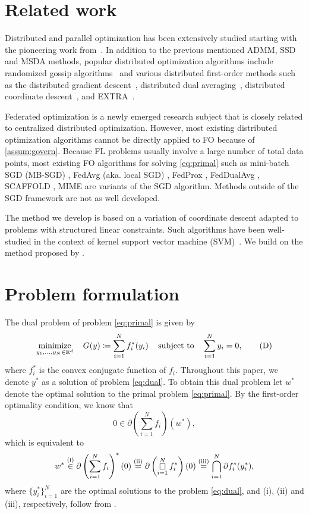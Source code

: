 \section{Related work}
\label{sec:relatedWork}

Distributed and parallel optimization has been extensively studied starting with the pioneering work from~\citet{Bertsekas89}. In addition to the previous mentioned ADMM, SSD and MSDA methods, popular distributed optimization algorithms include randomized gossip algorithms~\citep{BoydGPS06} and various distributed first-order methods such as the distributed gradient descent~\citep{NedicO09}, distributed dual averaging~\citep{DuchiAW12}, distributed coordinate descent~\citep{RichtarikT16}, and EXTRA~\citep{ShiLWY15}.

Federated optimization \citep{wang2021field} is a newly emerged research subject that is closely related to centralized distributed optimization. However, most existing distributed optimization algorithms cannot be directly applied to FO because of \autoref{assum:govern}. Because FL problems usually involve a large number of total data points, most existing FO algorithms for solving \eqref{eq:primal} such as mini-batch SGD (MB-SGD) \citep{WoodworthPS20}, FedAvg (aka. local SGD) \citep{McMahan17}, FedProx \citep{li2018federated}, FedDualAvg \citep{yuan2021federated},  SCAFFOLD \citep{pmlr-v119-karimireddy20a}, MIME \citep{karimireddy2020mime} are variants of the SGD algorithm. Methods outside of the SGD framework are not as well developed. 

The method we develop is based on a variation of coordinate descent adapted to problems with structured linear constraints. Such algorithms have been well-studied in the context of kernel support vector machine (SVM)~\citep{lut93,platt1998sequential,libsvm}. We build on the method proposed by \citet{necoara2017random}.

\section{Problem formulation}
\label{sec:problem}

The dual problem of problem \eqref{eq:primal} is given by 
\begin{equation} \label{eq:dual}
  \displaystyle\mathop{\hbox{\rm minimize}}_{y_1, \dots, y_N \in \mathbb{R}^d}\enspace\enspace G(y) \coloneqq \sum_{i=1}^N f_i^*(y_i) \enspace\enspace\mathop{\hbox{\rm subject to}}\enspace\enspace \sum_{i=1}^N y_i = 0, \tag{D}
\end{equation}
where $f_i^*$ is the convex conjugate function of $f_i$. Throughout this paper, we denote $y^*$ as a solution of problem \eqref{eq:dual}. To obtain this dual problem let $w^*$ denote the optimal solution to the primal problem \eqref{eq:primal}. By the first-order optimality condition, we know that 
\[0 \in \partial\left(\sum_{i = 1}^N f_i\right)(w^*),\]
which is equivalent to 
\[w^* \overset{\rm{(i)}}{\in} \partial\left(\sum_{i = 1}^N f_i\right)^*(0) \overset{\rm{(ii)}}{=} \partial\left(\mathop\square_{i=1}^N f_i^*\right)(0) \overset{\rm{(iii)}}{=} \bigcap_{i=1}^N \partial f_i^*(y_i^*),\]
where $\{y_i^*\}_{i=1}^N$ are the optimal solutions to the problem \eqref{eq:dual}, and (i), (ii) and (iii), respectively, follow from  \citet[Proposition~E.1.4.3, Proposition~E.2.3.2 and Corollary~D.4.5.5]{hiriart-urruty01}.

